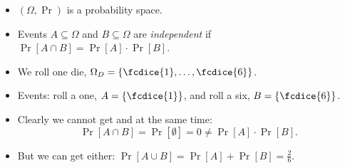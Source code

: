 \documentclass{beamer}
\begin{document}
\begin{frame}
  \begin{definition}
    \begin{itemize}
      \item \((\Omega, \Pr)\) is a probability space.
      \item Events \(A\subseteq \Omega\) and \(B\subseteq \Omega\) are 
        \emph{independent} if \(\Pr[A\cap B] = \Pr[A]\cdot \Pr[B]\).
    \end{itemize}
  \end{definition}

  \pause{}

  \begin{example}
    \begin{itemize}
      \item We roll one die, \(\Omega_D = \{\fcdice{1}, \ldots, \fcdice{6}\}\).
      \item Events: roll a one, \(A = \{\fcdice{1}\}\), and roll a six, \(B 
          = \{\fcdice{6}\}\).

        \pause{}

      \item Clearly we cannot get  and  at the same time:
        \[\Pr[A\cap B] = \Pr[\emptyset] = 0 \neq \Pr[A]\cdot \Pr[B].\]

      \item But we can get either: \(\Pr[A\cup B] = \Pr[A] + \Pr[B] 
          = \frac{2}{6}\).
    \end{itemize}
  \end{example}
\end{frame}
\end{document}
